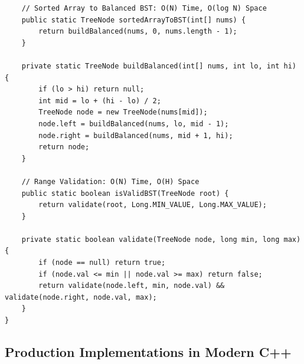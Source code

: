 \documentclass[10pt,journal,compsoc,onecolumn]{IEEEtran}
\begin{document}
\begin{verbatim}
    // Sorted Array to Balanced BST: O(N) Time, O(log N) Space
    public static TreeNode sortedArrayToBST(int[] nums) {
        return buildBalanced(nums, 0, nums.length - 1);
    }

    private static TreeNode buildBalanced(int[] nums, int lo, int hi) {
        if (lo > hi) return null;
        int mid = lo + (hi - lo) / 2;
        TreeNode node = new TreeNode(nums[mid]);
        node.left = buildBalanced(nums, lo, mid - 1);
        node.right = buildBalanced(nums, mid + 1, hi);
        return node;
    }

    // Range Validation: O(N) Time, O(H) Space
    public static boolean isValidBST(TreeNode root) {
        return validate(root, Long.MIN_VALUE, Long.MAX_VALUE);
    }

    private static boolean validate(TreeNode node, long min, long max) {
        if (node == null) return true;
        if (node.val <= min || node.val >= max) return false;
        return validate(node.left, min, node.val) && validate(node.right, node.val, max);
    }
}
\end{verbatim}

\subsection{Production Implementations in Modern C++}
\end{document}
